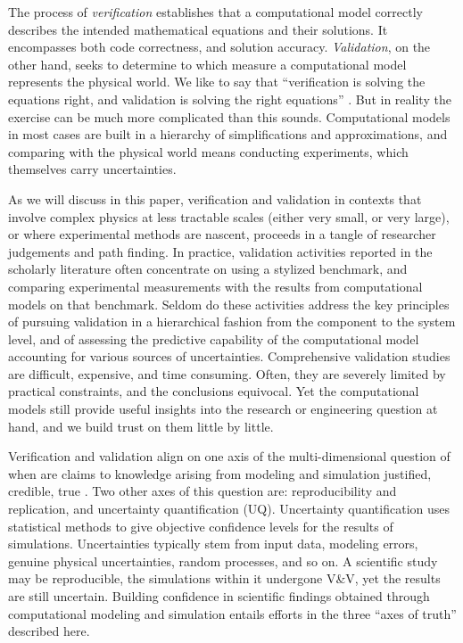 \noindent
The process of \emph{verification} establishes that a computational model correctly describes the intended mathematical equations and their solutions.
It encompasses both code correctness, and solution accuracy.
\emph{Validation}, on the other hand, seeks to determine to which measure a computational model represents the physical world. 
We like to say that ``verification is solving the equations right, and validation is solving the right equations'' \cite{roache1998}. 
But in reality the exercise can be much more complicated than this sounds. 
Computational models in most cases are built in a hierarchy of simplifications and approximations, and comparing with the physical world means conducting experiments, which themselves carry uncertainties. 

As we will discuss in this paper, verification and validation in contexts that involve complex physics at less tractable scales (either very small, or very large), or where experimental methods are nascent, proceeds in a tangle of researcher judgements and path finding. 
In practice, validation activities reported in the scholarly literature often concentrate on using a stylized benchmark, and comparing experimental measurements with the results from computational models on that benchmark. 
Seldom do these activities address the key principles of pursuing validation in a hierarchical fashion from the component to the system level, and of assessing the predictive capability of the computational model accounting for various sources of uncertainties. 
Comprehensive validation studies are difficult, expensive, and time consuming. 
Often, they are severely limited by practical constraints, and the conclusions equivocal. 
Yet the computational models still provide useful insights into the research or engineering question at hand, and we build trust on them little by little.

Verification and validation align on one axis of the multi-dimensional question of when are claims to knowledge arising from modeling and simulation justified, credible, true \cite{winsberg-2010}.
Two other axes of this question are: reproducibility and replication, and uncertainty quantification (UQ).
Uncertainty quantification uses statistical methods to give objective confidence levels for the results of simulations. 
Uncertainties typically stem from input data, modeling errors, genuine physical uncertainties, random processes, and so on. 
A scientific study may be reproducible, the simulations within it undergone V\&V, yet the results are still uncertain. 
Building confidence in scientific findings obtained through computational modeling and simulation entails efforts in the three ``axes of truth'' described here.

